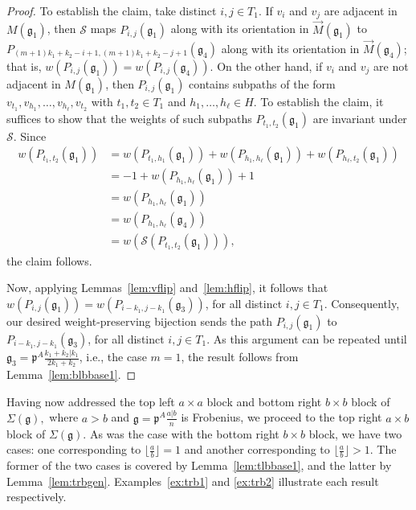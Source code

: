 \documentclass[letterpaper,10pt]{article}
\begin{document}
\begin{proof}
To establish the claim, take distinct $i,j\in T_1$. If $v_i$ and $v_j$ are adjacent in $M(\mathfrak{g}_1)$, then $\mathcal{S}$ maps $P_{i,j}(\mathfrak{g}_1)$ along with its orientation in $\overrightarrow{M}(\mathfrak{g}_1)$ to $P_{(m+1)k_1+k_2-i+1,(m+1)k_1+k_2-j+1}(\mathfrak{g}_4)$ along with its orientation in $\overrightarrow{M}(\mathfrak{g}_4)$; that is, $w(P_{i,j}(\mathfrak{g}_1))=w(P_{i,j}(\mathfrak{g}_4))$. On the other hand, if $v_i$ and $v_j$ are not adjacent in $M(\mathfrak{g}_1)$, then $P_{i,j}(\mathfrak{g}_1)$ contains subpaths of the form $v_{t_1},v_{h_1},\hdots,v_{h_{\ell}},v_{t_2}$ with $t_1,t_2\in T_1$ and $h_1,\hdots,h_{\ell}\in H$. To establish the claim, it suffices to show that the weights of such subpaths $P_{t_1,t_2}(\mathfrak{g}_1)$ are invariant under $\mathcal{S}.$ Since
\begin{align*}
w(P_{t_1,t_2}(\mathfrak{g}_1))&=w(P_{t_1,h_1}(\mathfrak{g}_1))+w(P_{h_1,h_{\ell}}(\mathfrak{g}_1))+w(P_{h_{\ell},t_2}(\mathfrak{g}_1)) \\
&=-1+w(P_{h_1,h_{\ell}}(\mathfrak{g}_1))+1 \\
&=w(P_{h_1,h_{\ell}}(\mathfrak{g}_1)) \\
&=w(P_{h_1,h_{\ell}}(\mathfrak{g}_4)) \\
&=w(\mathcal{S}(P_{t_1,t_2}(\mathfrak{g}_1))),
\end{align*}
the claim follows.

Now, applying Lemmas~\ref{lem:vflip} and~\ref{lem:hflip}, it follows that $w(P_{i,j}(\mathfrak{g}_1))=w(P_{i-k_1,j-k_1}(\mathfrak{g}_3))$, for all distinct $i,j\in T_1$. Consequently, our desired weight-preserving bijection sends the path $P_{i,j}(\mathfrak{g}_1)$ to $P_{i-k_1,j-k_1}(\mathfrak{g}_3)$, for all distinct $i,j\in T_1$. As this argument can be repeated until $\mathfrak{g}_3=\mathfrak{p}^A\frac{k_1+k_2|k_1}{2k_1+k_2}$, i.e., the case $m=1$, the result follows from Lemma~\ref{lem:blbbase1}.
\end{proof}

Having now addressed the top left $a\times a$ block and bottom right $b\times b$ block of $\Sigma(\mathfrak{g}),$ where $a>b$ and $\mathfrak{g}=\mathfrak{p}^A\frac{a|b}{n}$ is Frobenius, we proceed to the top right $a\times b$ block of $\Sigma(\mathfrak{g}).$ As was the case with the bottom right $b\times b$ block, we have two cases: one corresponding to $\lfloor\frac{a}{b}\rfloor=1$ and another corresponding to $\lfloor\frac{a}{b}\rfloor>1.$ The former of the two cases is covered by Lemma~\ref{lem:tlbbase1}, and the latter by Lemma~\ref{lem:trbgen}. Examples~\ref{ex:trb1} and \ref{ex:trb2} illustrate each result respectively.
\end{document}
